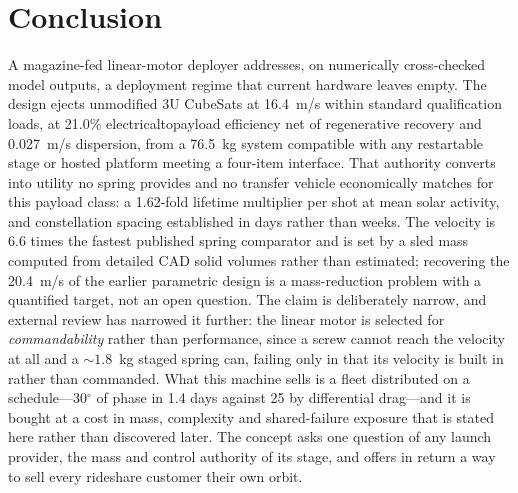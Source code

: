 \documentclass[conference]{IEEEtran}
\begin{document}
\section{Conclusion}
A magazine-fed linear-motor deployer addresses, on numerically cross-checked model outputs, a deployment regime that current hardware leaves empty. The design ejects unmodified 3U CubeSats at 16.4~m/s within standard qualification loads, at 21.0\% electrical\-to\-payload efficiency net of regenerative recovery and 0.027~m/s dispersion, from a 76.5~kg system compatible with any restartable stage or hosted platform meeting a four-item interface. That authority converts into utility no spring provides and no transfer vehicle economically matches for this payload class: a 1.62-fold lifetime multiplier per shot at mean solar activity, and constellation spacing established in days rather than weeks. The velocity is 6.6 times the fastest published spring comparator and is set by a sled mass computed from detailed CAD solid volumes rather than estimated; recovering the 20.4~m/s of the earlier parametric design is a mass-reduction problem with a quantified target, not an open question. The claim is deliberately narrow, and external review has narrowed it further: the linear motor is selected for \emph{commandability} rather than performance, since a screw cannot reach the velocity at all and a ${\sim}1.8$~kg staged spring can, failing only in that its velocity is built in rather than commanded. What this machine sells is a fleet distributed on a schedule---30$^\circ$ of phase in 1.4 days against 25 by differential drag---and it is bought at a cost in mass, complexity and shared-failure exposure that is stated here rather than discovered later. The concept asks one question of any launch provider, the mass and control authority of its stage, and offers in return a way to sell every rideshare customer their own orbit.
\end{document}
